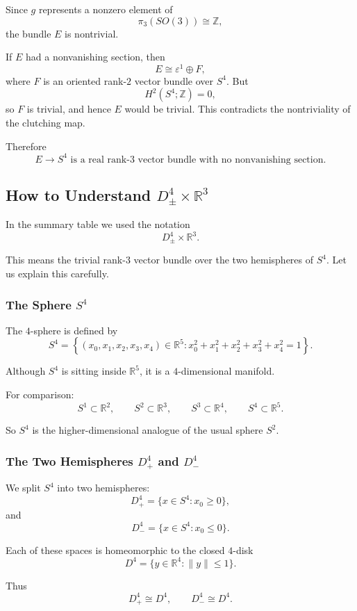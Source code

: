\documentclass[12pt,a4paper]{article}
\theoremstyle{notespace}
\begin{document}
Since \(g\) represents a nonzero element of
\[
\pi_3(SO(3))\cong \mathbb Z,
\]
the bundle \(E\) is nontrivial.

If \(E\) had a nonvanishing section, then
\[
E\cong \varepsilon^1\oplus F,
\]
where \(F\) is an oriented rank-\(2\) vector bundle over \(S^4\). But
\[
H^2(S^4;\mathbb Z)=0,
\]
so \(F\) is trivial, and hence \(E\) would be trivial. This contradicts the nontriviality of the clutching map.

Therefore
\[
\boxed{
	E\to S^4 \text{ is a real rank-\(3\) vector bundle with no nonvanishing section.}
}
\]

\subsection{How to Understand \(D^4_\pm\times \mathbb R^3\)}

In the summary table we used the notation
\[
D^4_\pm\times \mathbb R^3.
\]

This means the trivial rank-\(3\) vector bundle over the two hemispheres of \(S^4\). Let us explain this carefully.

\subsubsection{The Sphere \(S^4\)}

The \(4\)-sphere is defined by
\[
S^4
=
\left\{
(x_0,x_1,x_2,x_3,x_4)\in \mathbb R^5
:
x_0^2+x_1^2+x_2^2+x_3^2+x_4^2=1
\right\}.
\]

Although \(S^4\) is sitting inside \(\mathbb R^5\), it is a \(4\)-dimensional manifold.

For comparison:
\[
S^1\subset \mathbb R^2,
\qquad
S^2\subset \mathbb R^3,
\qquad
S^3\subset \mathbb R^4,
\qquad
S^4\subset \mathbb R^5.
\]

So \(S^4\) is the higher-dimensional analogue of the usual sphere \(S^2\).

\subsubsection{The Two Hemispheres \(D^4_+\) and \(D^4_-\)}

We split \(S^4\) into two hemispheres:
\[
D^4_+
=
\{x\in S^4: x_0\geq 0\},
\]
and
\[
D^4_-
=
\{x\in S^4: x_0\leq 0\}.
\]

Each of these spaces is homeomorphic to the closed \(4\)-disk
\[
D^4
=
\{y\in \mathbb R^4:\|y\|\leq 1\}.
\]

Thus
\[
D^4_+\cong D^4,
\qquad
D^4_-\cong D^4.
\]
\end{document}
